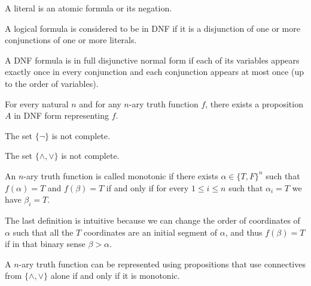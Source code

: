 \documentclass[11pt,a4paper]{article}
\begin{document}
  \begin{definition}[Literal]
    A literal is an atomic formula or its negation.
  \end{definition}

  \begin{definition}
    A logical formula is considered to be in DNF if it is a disjunction of 
    one or more conjunctions of one or more literals.
  \end{definition}

  \begin{remark}
    A DNF formula is in full disjunctive normal form if each of its 
    variables appears exactly once in every conjunction and each 
    conjunction appears at most once (up to the order of variables).
  \end{remark}

  \begin{proposition}
    For every natural $n$ and for any $n$-ary truth function $f$,
    there exists a proposition $A$ in DNF form representing $f$.
  \end{proposition}

  \begin{proposition}
    The set $\{\neg\}$ is not complete.
  \end{proposition}

  \begin{proposition}
    The set $\{\land, \lor\}$ is not complete.
  \end{proposition}

  \begin{definition}
    An $n$-ary truth function is called monotonic if there exists
    $\alpha \in \{T, F\}^n$ such that $f(\alpha) = T$ and $f(\beta) = T$
    if and only if for every $1 \le i \le n$ such that $\alpha_i = T$
    we have $\beta_i = T$.
  \end{definition}

  \begin{remark}
    The last definition is intuitive because we can change the order of
    coordinates of $\alpha$ such that all the $T$ coordinates are an
    initial segment of $\alpha$, and thus $f(\beta) = T$ if in that binary
    sense $\beta > \alpha$.
  \end{remark}

  \begin{proposition}
    A $n$-ary truth function can be represented using propositions that use
    connectives from $\{\land, \lor\}$ alone if and only if it is monotonic.
  \end{proposition}
\end{document}
